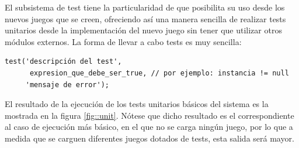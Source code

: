 El subsistema de test tiene la particularidad de que posibilita su uso desde los nuevos juegos que se creen, ofreciendo así una manera sencilla de realizar tests unitarios desde la implementación del nuevo juego sin tener que utilizar otros módulos externos. La forma de llevar a cabo tests es muy sencilla:

\begin{verbatim}
test('descripción del test', 
      expresion_que_debe_ser_true, // por ejemplo: instancia != null
     'mensaje de error');
\end{verbatim}

El resultado de la ejecución de los tests unitarios básicos del sistema es la mostrada en la figura \ref{fig::unit}. Nótese que dicho resultado es el correspondiente al caso de ejecución más básico, en el que no se carga ningún juego, por lo que a medida que se carguen diferentes juegos dotados de tests, esta salida será mayor.


